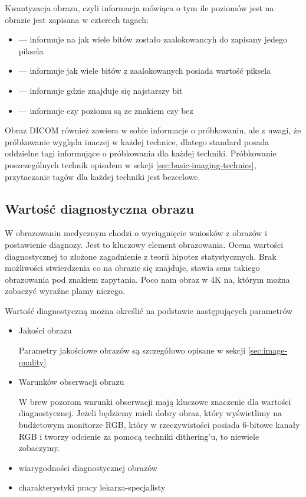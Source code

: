 \par
Kwantyzacja obrazu, czyli informacja mówiąca o tym ile poziomów jest na obrazie jest zapisana w czterech tagach:
\begin{itemize}
    \item {} --- informuje na jak wiele bitów zostało zaalokowancyh do zapisany jedego piksela
    \item {} --- informuje jak wiele bitów z zaalokowanych posiada wartość piksela
    \item {} --- informuje gdzie znajduje się najstarszy bit
    \item {} --- informuje czy poziomu są ze znakiem czy bez
\end{itemize}

\par
Obraz DICOM również zawiera w sobie informacje o próbkowaniu, ale z uwagi, że próbkowanie wygląda inaczej w każdej technice, dlatego standard posada oddzielne tagi informujące o próbkowania dla każdej techniki.
Próbkowanie poszczególnych technik opisałem w sekcji \ref{sec:basic-imaging-technics}, przytaczanie tagów dla każdej techniki jest bezcelowe.

\subsection{Wartość diagnostyczna obrazu}

W obrazowaniu medycznym chodzi o wyciągnięcie wniosków z obrazów i postawienie diagnozy.
Jest to kluczowy element obrazowania.
Ocena wartości diagnostycznej to złożone zagadnienie z teorii hipotez statystycznych.
Brak możliwości stwierdzenia co na obrazie się znajduje, stawia sens takiego obrazowania pod znakiem zapytania.
Poco nam obraz w 4K na, którym można zobaczyć wyraźne plamy niczego.

Wartość diagnostyczną można określić na podstawie następujących parametrów
\begin{itemize}
    \item Jakości obrazu

          Parametry jakościowe obrazów są szczegółowo opisane w sekcji \ref{sec:image-quality}

    \item Warunków obserwacji obrazu

          W brew pozorom warunki obserwacji mają kluczowe znaczenie dla wartości diagnostycznej.
          Jeżeli będziemy mieli dobry obraz, który wyświetlimy na budżetowym monitorze RGB, który w rzeczywistości posiada 6-bitowe kanały RGB i tworzy odcienie za pomocą techniki dithering'u, to niewiele zobaczymy.

    \item wiarygodności diagnostycznej obrazów

    \item charakterystyki pracy lekarza-specjalisty

\end{itemize}

